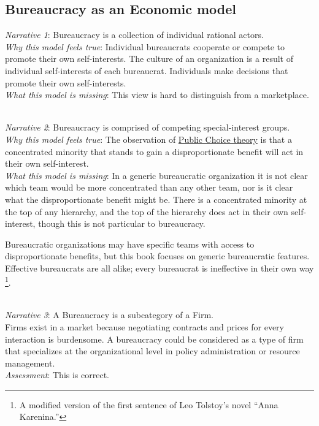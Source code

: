 \subsection*{Bureaucracy as an Economic model}

\textit{Narrative 1}: Bureaucracy is a collection of individual rational actors. \\
\textit{Why this model feels true}: Individual bureaucrats cooperate or compete to promote their own self-interests.
The culture of an organization is a result of individual self-interests of each bureaucrat.
Individuals make decisions that promote their own self-interests. \\
\textit{What this model is missing}: This view is hard to distinguish from a marketplace. 

\ \\
\textit{Narrative 2}: Bureaucracy is comprised of competing special-interest groups. \\
\textit{Why this model feels true}: The observation of \href{https://en.wikipedia.org/wiki/Public_choice}{Public Choice theory} 
is that a concentrated minority that stands to gain a disproportionate benefit will act in their own self-interest. \\
\textit{What this model is missing}: In a generic bureaucratic organization it is not clear which team would be more concentrated than any other team, nor is it clear what the disproportionate benefit might be. There is a concentrated minority at the top of any hierarchy, and the top of the hierarchy does act in their own self-interest, though this is not particular to bureaucracy.

Bureaucratic organizations may have specific teams with access to disproportionate benefits, but this book focuses on generic bureaucratic features. Effective bureaucrats are all alike; every bureaucrat is ineffective in their own way
\footnote{A modified version of the first sentence of Leo Tolstoy's novel ``Anna Karenina.''}.



\ \\
\textit{Narrative 3}: A Bureaucracy is a subcategory of a Firm. \\
Firms exist in a market because negotiating contracts and prices for every interaction is burdensome. 
A bureaucracy could be considered as a type of firm that specializes at the organizational level in policy administration or resource management. \\
\textit{Assessment}: This is correct.

